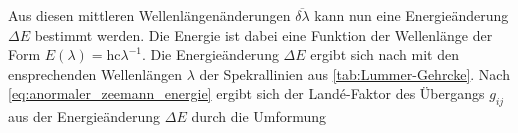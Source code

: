 %
%
Aus diesen mittleren Wellenlängenänderungen $\overline{\delta \lambda}$ kann nun
eine Energieänderung $\Delta E$ bestimmt werden. Die Energie ist dabei eine Funktion
der Wellenlänge der Form $E(\lambda) = \mathrm{hc}\lambda^{-1}$.
Die Energieänderung $\Delta E$ ergibt sich nach
%
mit den ensprechenden Wellenlängen $\lambda$ der Spekrallinien aus \ref{tab:Lummer-Gehrcke}.
Nach \ref{eq:anormaler_zeemann_energie} ergibt sich der Landé-Faktor des
Übergangs $g_{ij}$ aus der Energieänderung $\Delta E$ durch die Umformung
%
%
%

